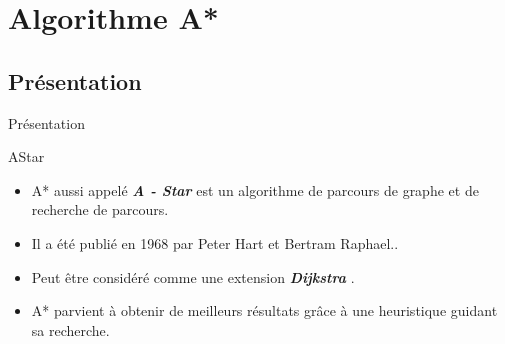 \documentclass{beamer}
\begin{document}
\section{Algorithme A*}
    \subsection{Présentation}
    \begin{frame}{Présentation}
       \begin{block}{AStar}
        \begin{itemize}
            \item A* aussi appelé \textbf{\textit{A - Star}} est un algorithme de parcours de graphe et de recherche de parcours.\\
            \item Il a été publié en 1968 par Peter Hart et Bertram Raphael.\cite{WikiAstar}.
            \item Peut être considéré comme une extension \textbf{\textit{Dijkstra}} \cite{WikiDijkstra}.
            \item A* parvient à obtenir de meilleurs résultats grâce à une heuristique guidant sa recherche.
        \end{itemize}   
       \end{block}
    \end{frame}
  
\end{document}
